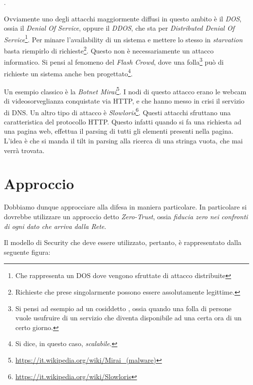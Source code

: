 \documentclass[14pt]{extreport}
\begin{document}
\begin{center}
    \textit{}.
\end{center}


Ovviamente uno degli attacchi maggiormente diffusi in questo ambito è il \textit{DOS}, ossia il \textit{Denial Of Service}, oppure il \textit{DDOS}, che sta per \textit{Distributed Denial Of Service}\footnote{Che rappresenta un DOS dove vengono sfruttate  di attacco distribuite}. Per minare l'availability di un sistema e mettere lo stesso in \textit{starvation} basta riempirlo di richieste\footnote{Richieste che prese singolarmente possono essere assolutamente legittime.}. Questo non è necessariamente un attacco informatico. Si pensi al fenomeno del \textit{Flash Crowd}, dove una folla\footnote{Si pensi ad esempio ad un cosiddetto , ossia quando una folla di persone vuole usufruire di un servizio che diventa disponibile ad una certa ora di un certo giorno.} può  di richieste un sistema anche ben progettato\footnote{Si dice, in questo caso, \textit{scalabile}.}.

Un esempio classico è la \textit{Botnet Mirai}\footnote{\url{https://it.wikipedia.org/wiki/Mirai_(malware)}}. I nodi di questo attacco erano le webcam di videosorveglianza conquistate via HTTP, e che hanno messo in crisi il servizio di DNS. Un altro tipo di attacco è \textit{Slowloris}\footnote{\url{https://it.wikipedia.org/wiki/Slowloris}}. Questi attacchi sfruttano una caratteristica del protocollo HTTP. Questo infatti quando si fa una richiesta ad una pagina web, effettua il parsing di tutti gli elementi presenti nella pagina. L'idea è che si manda il tilt in parsing alla ricerca di una stringa vuota, che mai verrà trovata.



\section{Approccio}
Dobbiamo dunque approcciare alla difesa in maniera particolare. In particolare si dovrebbe utilizzare un approccio detto \textit{Zero-Trust}, ossia \textit{fiducia zero nei confronti di ogni dato che arriva dalla Rete}.

Il modello di Security che deve essere utilizzato, pertanto, è rappresentato dalla seguente figura:
\end{document}
